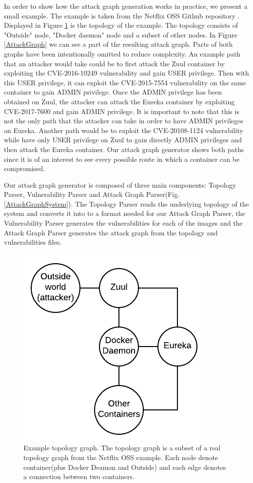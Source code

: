 In order to show how the attack graph generation works in practice, we present a small example. The example is taken from the Netflix OSS Github repository \cite{netflixoss}. Displayed in Figure \ref{TopologyGraph} is the topology of the example. The topology consists of "Outside" node, "Docker daemon" node and a subset of other nodes. In Figure \ref{AttackGraph} we can see a part of the resulting attack graph. Parts of both graphs have been intentionally omitted to reduce complexity. An example path that an attacker would take could be to first attack the Zuul container by exploiting the CVE-2016-10249 vulnerability and gain USER privilege. Then with this USER privilege, it can exploit the CVE-2015-7554 vulnerability on the same container to gain ADMIN privilege. Once the ADMIN privilege has been obtained on Zuul, the attacker can attack the Eureka container by exploiting CVE-2017-7600 and gain ADMIN privilege. It is important to note that this is not the only path that the attacker can take in order to have ADMIN privileges on Eureka. Another path would be to exploit the CVE-20108-1124 vulnerability while have only USER privilege on Zuul to gain directly ADMIN privileges and then attack the Eureka container. Our attack graph generator shows both paths since it is of an interest to see every possible route in which a container can be compromised.

Our attack graph generator is composed of three main components: Topology Parser, Vulnerability Parser and Attack Graph Parser(Fig. \ref{AttackGraphSystem}). The Topology Parser reads the underlying topology of the system and converts it into to a format needed for our Attack Graph Parser, the Vulnerability Parser generates the vulnerabilities for each of the images and the Attack Graph Parser generates the attack graph from the topology and vulnerabilities files. 

\begin{figure}
	\includegraphics[]{./images/Topology_graph}
	\caption{Example topology graph. The topology graph is a subset of a real topology graph from the Netflix OSS example. Each node denote container(plus Docker Deamon and Outside) and each edge denotes a connection between two containers.}
	\label{TopologyGraph}
\end{figure}

